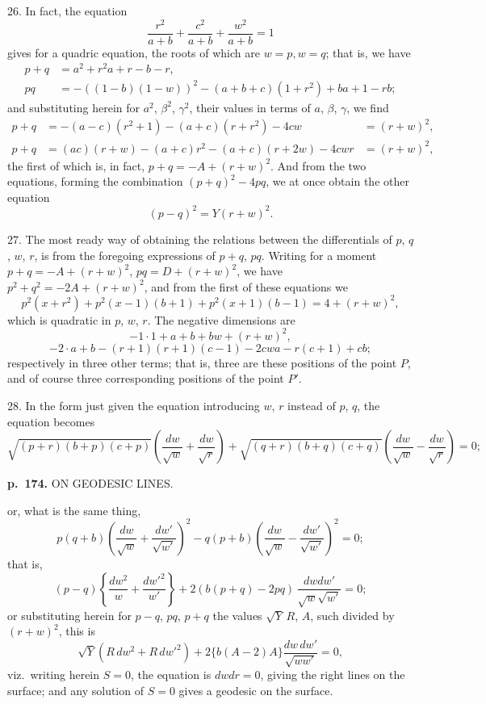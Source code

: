 \documentclass[11pt,a4paper]{article}
\begin{document}
26. In fact, the equation
\[
\frac{r^2}{a + b} + \frac{c^2}{a + b} + \frac{w^2}{a + b} = 1
\]
gives for a quadric equation, the roots of which are $w = p, w = q$; that is, we have
\begin{align*}
p + q &= a^2 + r^2 a + r - b - r, \\
p q &= -((1 - b)(1 - w))^2 - (a + b + c)(1 + r^2) + b a + 1 - rb;
\end{align*}
and substituting herein for $a^2$, $\beta^2$, $\gamma^2$, their values in terms of $a$, $\beta$, $\gamma$, we find
\begin{align*}
p + q &= -(a - c)(r^2 + 1) - (a + c)(r + r^2) - 4cw  &= (r + w)^2, \\
p + q &= (a c)(r + w) - (a + c)r^2 - (a + c)(r + 2w) - 4cwr  &= (r + w)^2,
\end{align*}
the first of which is, in fact, $p + q = -A + (r + w)^2$.  And from the two equations, forming the combination $(p + q)^2 - 4pq$, we at once obtain the other equation
\[
(p - q)^2 = Y(r + w)^2.
\]

27. The most ready way of obtaining the relations between the differentials of $p$, $q$, $w$, $r$, is from the foregoing expressions of $p + q$, $pq$.  Writing for a moment $p + q = -A + (r + w)^2$, $pq = D + (r + w)^2$, we have $p^2 + q^2 = -2A + (r + w)^2$, and from the first of these equations we
\[
p^2 (x + r^2) + p^2 (x - 1)(b + 1) + p^2 (x + 1)(b - 1) = 4 + (r + w)^2,
\]
which is quadratic in $p$, $w$, $r$.  The negative dimensions are
\[
-1 \cdot 1 + a + b + bw + (r + w)^2,
\]
\[
-2 \cdot a + b - (r + 1)(r + 1)(c - 1) - 2cwa - r(c + 1) + cb;
\]
respectively in three other terms; that is, three are these positions of the point $P$, and of course three corresponding positions of the point $P'$.

28. In the form just given the equation introducing $w$, $r$ instead of $p$, $q$, the equation becomes
\[
\sqrt{(p+r)(b+p)(c+p)}\left(\frac{dw}{\sqrt{w}}+\frac{dw}{\sqrt{r}}\right)+\sqrt{(q+r)(b+q)(c+q)}\left(\frac{dw}{\sqrt{w}}-\frac{dw}{\sqrt{r}}\right)=0;
\]

\clearpage

\noindent
\textbf{p.~174.}  ON GEODESIC LINES.

or, what is the same thing,
\[
p(q + b)\left(\frac{dw}{\sqrt{w}} + \frac{dw'}{\sqrt{w'}}\right)^2 - q(p + b)\left(\frac{dw}{\sqrt{w}} - \frac{dw'}{\sqrt{w'}}\right)^2 = 0;
\]
that is,
\[
(p - q)\left\{\frac{dw^2}{w} + \frac{dw'^2}{w'}\right\} + 2 (b(p + q) - 2pq)\, \frac{dw dw'}{\sqrt{w}\sqrt{w'}} = 0;
\]
or substituting herein for $p - q$, $pq$, $p + q$ the values $\sqrt{Y}\, R$, $A$, such divided by $(r + w)^2$, this is
\[
\sqrt{Y}(R\, dw^2 + R\, dw'^2) + 2 \{b(A - 2)A\} \frac{dw\, dw'}{\sqrt{ww'}} = 0,
\]
viz.\ writing herein $S = 0$, the equation is $dw dr = 0$, giving the right lines on the surface; and any solution of $S = 0$ gives a geodesic on the surface.
\end{document}
